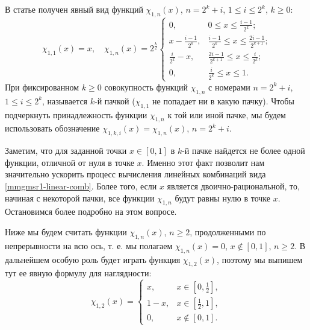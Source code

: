 В статье \cite{mmgmsr1-SharapudinovMuratova} получен явный вид функций $\chi_{1,n}(x)$, $n=2^k+i$, $1 \le i \le 2^k$, $k \ge 0$:
\begin{equation}\label{mmgmsr1-chi-1k}
\chi_{1,1}(x)=x, \quad
\chi_{1,n}(x)=2^{\frac{k}{2}}
\begin{cases} 0,&\text{$0\le x\le\frac{i-1}{2^k}$;}\\
x-\frac{i-1}{2^k},&\text{$\frac{i-1}{2^k}\le x\le \frac{2i-1}{2^{k+1}}$;}\\
\frac{i}{2^{k}}-x,&\text{$\frac{2i-1}{2^{k+1}}\le x\le \frac{i}{2^{k}}$;}\\
0, &\text{$\frac{i}{2^{k}}\le x\le1$}.
\end{cases}
\end{equation}
При фиксированном $k \ge 0$ совокупность функций $\chi_{1,n}$ с номерами $n=2^k+i$, $1 \le i \le 2^k$, называется $k$-й пачкой ($\chi_{1,1}$ не попадает ни в какую пачку). Чтобы подчеркнуть принадлежность функции $\chi_{1,n}$ к той или иной пачке, мы будем использовать обозначение $\chi_{1,k,i}(x)=\chi_{1,n}(x)$, $n=2^k+i$.

Заметим, что для заданной точки $x \in [0,1]$ в $k$-й пачке найдется не более одной функции, отличной от нуля в точке $x$. Именно этот факт позволит нам значительно ускорить процесс вычисления линейных комбинаций вида \eqref{mmgmsr1-linear-comb}. Более того, если $x$ является двоично-рациональной, то, начиная с некоторой пачки, все функции $\chi_{1,n}$ будут равны нулю в точке $x$. Остановимся более подробно на этом вопросе.

Ниже мы будем считать функции $\chi_{1,n}(x)$, $n \ge 2$, продолженными по непрерывности на всю ось, т. е. мы полагаем $\chi_{1,n}(x)=0$, $x \notin [0,1]$, $n \ge 2$. В дальнейшем особую роль будет играть функция $\chi_{1,2}(x)$, поэтому мы выпишем тут ее явную формулу для наглядности:
\begin{equation}\label{mmgmsr1-chi12}
\chi_{1,2}(x)=
\begin{cases}
x, &x \in [0,\frac{1}{2}],\\
1-x, &x \in [\frac{1}{2},1],\\
0, &x \notin [0,1].
\end{cases}
\end{equation}

